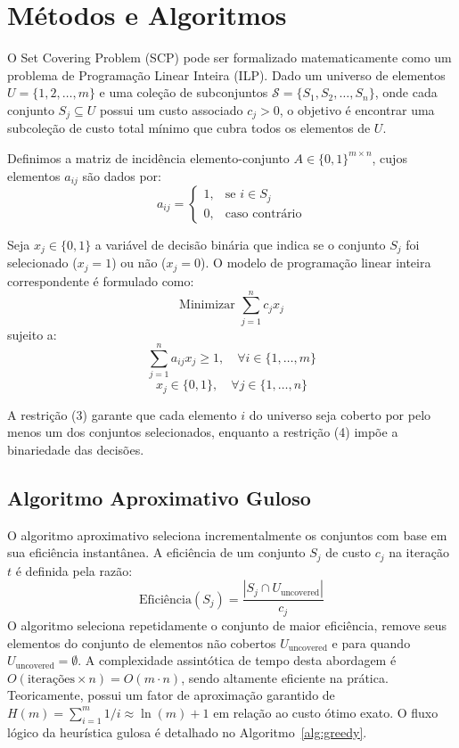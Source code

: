 \documentclass[conference]{IEEEtran}
\begin{document}
\section{Métodos e Algoritmos}
O Set Covering Problem (SCP) pode ser formalizado matematicamente como um problema de Programação Linear Inteira (ILP). Dado um universo de elementos $U = \{1, 2, \dots, m\}$ e uma coleção de subconjuntos $\mathcal{S} = \{S_1, S_2, \dots, S_n\}$, onde cada conjunto $S_j \subseteq U$ possui um custo associado $c_j > 0$, o objetivo é encontrar uma subcoleção de custo total mínimo que cubra todos os elementos de $U$.

Definimos a matriz de incidência elemento-conjunto $A \in \{0,1\}^{m \times n}$, cujos elementos $a_{ij}$ são dados por:
\begin{equation}
a_{ij} = \begin{cases} 
1, & \text{se } i \in S_j \\
0, & \text{caso contrário}
\end{cases}
\end{equation}

Seja $x_j \in \{0, 1\}$ a variável de decisão binária que indica se o conjunto $S_j$ foi selecionado ($x_j = 1$) ou não ($x_j = 0$). O modelo de programação linear inteira correspondente é formulado como:
\begin{equation}
\text{Minimizar } \sum_{j=1}^n c_j x_j
\end{equation}
sujeito a:
\begin{equation}
\sum_{j=1}^n a_{ij} x_j \ge 1, \quad \forall i \in \{1, \dots, m\}
\end{equation}
\begin{equation}
x_j \in \{0, 1\}, \quad \forall j \in \{1, \dots, n\}
\end{equation}

A restrição (3) garante que cada elemento $i$ do universo seja coberto por pelo menos um dos conjuntos selecionados, enquanto a restrição (4) impõe a binariedade das decisões.

\subsection{Algoritmo Aproximativo Guloso}
O algoritmo aproximativo seleciona incrementalmente os conjuntos com base em sua eficiência instantânea. A eficiência de um conjunto $S_j$ de custo $c_j$ na iteração $t$ é definida pela razão:
\begin{equation}
\text{Eficiência}(S_j) = \frac{|S_j \cap U_{\text{uncovered}}|}{c_j}
\end{equation}
O algoritmo seleciona repetidamente o conjunto de maior eficiência, remove seus elementos do conjunto de elementos não cobertos $U_{\text{uncovered}}$ e para quando $U_{\text{uncovered}} = \emptyset$. A complexidade assintótica de tempo desta abordagem é $O(\text{iterações} \times n) = O(m \cdot n)$, sendo altamente eficiente na prática. Teoricamente, possui um fator de aproximação garantido de $H(m) = \sum_{i=1}^m 1/i \approx \ln(m) + 1$ em relação ao custo ótimo exato. O fluxo lógico da heurística gulosa é detalhado no Algoritmo~\ref{alg:greedy}.
\end{document}
